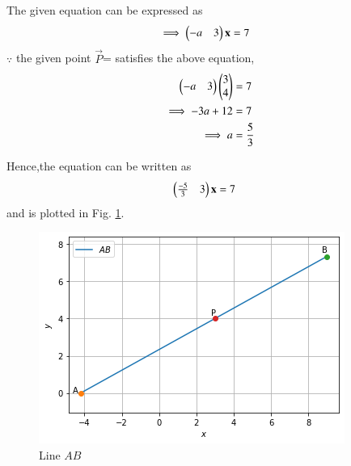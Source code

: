
The given equation can be expressed as
\begin{align}
\implies \begin{pmatrix}-a & 3\end{pmatrix}\mathbf{x} &= 7
\end{align}
%
$\because$ the given point $\vec{P}$= satisfies the above equation,
\begin{align}
\begin{pmatrix}-a & 3\end{pmatrix}\begin{pmatrix}3\\4\end{pmatrix} &= 7
\\
\implies -3a +12 &= 7
\\
\implies a &= \frac{5}{3}
\end{align}

Hence,the equation can be written as 
\begin{align}
\begin{pmatrix}\frac{-5}{3} & 3\end{pmatrix}\mathbf{x} &= 7
\end{align}
and is plotted in Fig. \ref{su2021/2/5/fig:line}.	



\begin{figure}[!ht]
\centering
\includegraphics[width=\columnwidth]{solutions/su2021/2/5/Figure4.png}
\caption{Line $AB$}
\label{su2021/2/5/fig:line}	
\end{figure}



